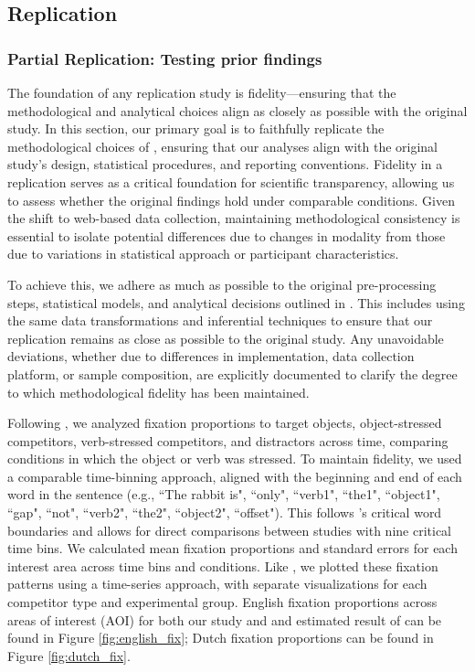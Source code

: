 \subsection{Replication}
\subsubsection{Partial Replication: Testing prior findings}

The foundation of any replication study is fidelity—ensuring that the methodological and analytical choices align as closely as possible with the original study. In this section, our primary goal is to faithfully replicate the methodological choices of \cite{Ge2021}, ensuring that our analyses align with the original study’s design, statistical procedures, and reporting conventions. Fidelity in a replication serves as a critical foundation for scientific transparency, allowing us to assess whether the original findings hold under comparable conditions. Given the shift to web-based data collection, maintaining methodological consistency is essential to isolate potential differences due to changes in modality from those due to variations in statistical approach or participant characteristics. 

To achieve this, we adhere as much as possible to the original pre-processing steps, statistical models, and analytical decisions outlined in \cite{Ge2021}. This includes using the same data transformations and inferential techniques to ensure that our replication remains as close as possible to the original study. Any unavoidable deviations, whether due to differences in implementation, data collection platform, or sample composition, are explicitly documented to clarify the degree to which methodological fidelity has been maintained.

Following \cite{Ge2021}, we analyzed fixation proportions to target objects, object-stressed competitors, verb-stressed competitors, and distractors across time, comparing conditions in which the object or verb was stressed. To maintain fidelity, we used a comparable time-binning approach, aligned with the beginning and end of each word in the sentence (e.g., ``The rabbit is", ``only", ``verb1", ``the1", ``object1", ``gap", ``not", ``verb2", ``the2", ``object2", ``offset"). This follows \cite{Ge2021}’s critical word boundaries and allows for direct comparisons between studies with nine critical time bins. We calculated mean fixation proportions and standard errors for each interest area across time bins and conditions. Like \cite{Ge2021}, we plotted these fixation patterns using a time-series approach, with separate visualizations for each competitor type and experimental group. English fixation proportions across areas of interest (AOI) for both our study and and estimated result of \cite{Ge2021} can be found in Figure \ref{fig:english_fix}; Dutch fixation proportions can be found in Figure \ref{fig:dutch_fix}.

